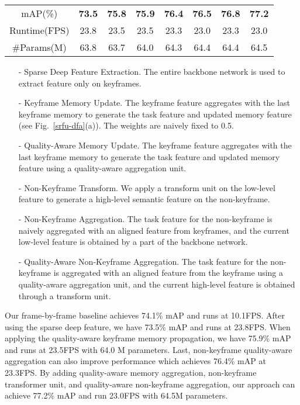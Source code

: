\documentclass[runningheads]{llncs}
\begin{document}
\begin{table}[t]
\begin{tabular}{c|ccccccc}
mAP(\%)                            & \textbf{73.5}      & \textbf{75.8}       & \textbf{75.9}          & \textbf{76.4}          & \textbf{76.5}     &  \textbf{76.8}  & \textbf{77.2}   \\
Runtime(FPS)                        & 23.8        & 23.5           & 23.5              & 23.3              & 23.0         &  23.3      & 23.0        \\
\#Params(M)                & 63.8         & 63.7         & 64.0            & 64.3            & 64.4       &  64.4    & 64.5     \\
\bottomrule
\end{tabular}
\label{table:ablation experiments}
\end{table}

\begin{itemize}
\item[-] Sparse Deep Feature Extraction. The entire backbone network is used to extract feature only on keyframes.
\item[-] Keyframe Memory Update. The keyframe feature aggregates with the last keyframe memory to generate the task feature and updated memory feature (see Fig.~\ref{srfu-dfa}(a)). The weights are naively fixed to 0.5.
\item[-] Quality-Aware Memory Update. The keyframe feature aggregates with the last keyframe memory to generate the task feature and updated memory feature using a quality-aware aggregation unit.
\item[-] Non-Keyframe Transform. We apply a transform unit on the low-level feature to generate a high-level semantic feature on the non-keyframe.
\item[-] Non-Keyframe Aggregation. The task feature for the non-keyframe is naively aggregated with an aligned feature from keyframes, and the current low-level feature is obtained by a part of the backbone network.
\item[-] Quality-Aware Non-Keyframe Aggregation. The task feature for the non-keyframe is aggregated with an aligned feature from the keyframe using a quality-aware aggregation unit, and the current high-level feature is obtained through a transform unit.
\end{itemize}



Our frame-by-frame baseline achieves 74.1\% mAP and runs at 10.1FPS. After using the sparse deep feature, we have 73.5\% mAP and runs at 23.8FPS. When applying the quality-aware keyframe memory propagation, we have 75.9\% mAP and runs at 23.5FPS with 64.0 M parameters. Last, non-keyframe quality-aware aggregation can also improve performance which achieves 76.4\% mAP at 23.3FPS. By adding quality-aware memory aggregation, non-keyframe transformer unit, and quality-aware non-keyframe aggregation, our approach can achieve 77.2\% mAP and run 23.0FPS with 64.5M parameters.
\end{document}

